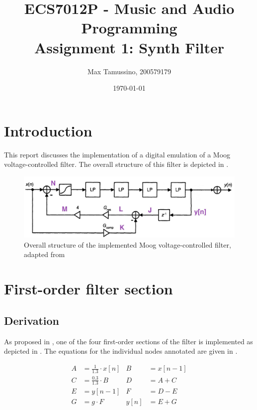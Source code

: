 \documentclass[a4paper, 12pt]{article}
\title{ECS7012P - Music and Audio Programming\\
	   Assignment 1: Synth Filter}
\author{
  Max Tamussino, 200579179
}
\date{\today}
\begin{document}
\maketitle
\tableofcontents
\pagebreak

\section{Introduction} \label{sec:intro}
This report discusses the implementation of a digital emulation \cite{Stilson1996} of a Moog voltage-controlled filter. The overall structure of this filter is depicted in .

\begin{figure}
	\centering
	\includegraphics[width=\textwidth]{feedback.jpg}
	\caption{Overall structure of the implemented Moog voltage-controlled filter, adapted from \cite{Vaelimaeki2006}}
	\label{fig:overall-structure}
\end{figure}

\section{First-order filter section} \label{sec:first-order-fs}
\subsection{Derivation}
As proposed in \cite{Vaelimaeki2006}, one of the four first-order sections of the filter is implemented as depicted in . The equations for the individual nodes annotated are given in . 

\begin{align}
	\label{eq:nodes1}
	A &= \frac{1}{1.3} \cdot x[n] & B &= x[n-1] \\
	\label{eq:nodes2}
	C &= \frac{0.3}{1.3} \cdot B & D &= A + C \\
	\label{eq:nodes3}
	E &= y[n-1] & F &= D - E \\
	\label{eq:nodes4}
	G &= g \cdot F & y[n] &= E + G
\end{align}
\end{document}
